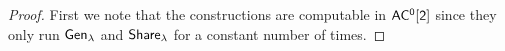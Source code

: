 \begin{proof}
%
First we note that the constructions are computable in $\mathsf{AC^0[2]}$ since they only run ${\mathsf{Gen}}_\lambda$ and ${\mathsf{Share}}_\lambda$ for a constant number of times.


\end{proof}
